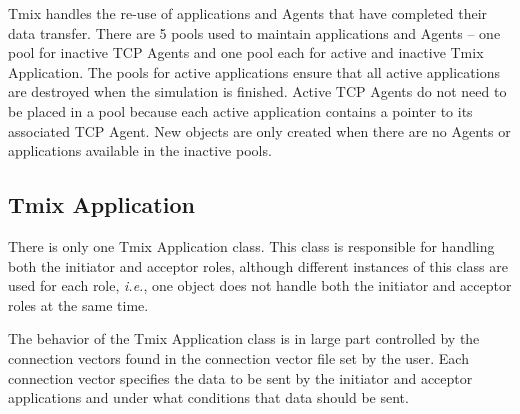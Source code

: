 Tmix handles the re-use of applications and Agents that have
completed their data transfer. There are 5 pools used to maintain
applications and Agents -- one pool for inactive TCP Agents and one
pool each for active and inactive Tmix Application. The
pools for active applications ensure that all active applications are
destroyed when the simulation is finished. Active TCP Agents do not
need to be placed in a pool because each active application contains a
pointer to its associated TCP Agent. New objects are only created when
there are no Agents or applications available in the inactive pools. 

\subsection{Tmix Application}

There is only one Tmix Application class.  This class is responsible for
handling both the initiator and acceptor roles, although different instances
of this class are used for each role, \emph{i.e.}, one object does
not handle both the initiator and acceptor roles at the same time.

The behavior of the Tmix Application class is in large part controlled by
the connection vectors found in the connection vector file set by
the user.  Each connection vector specifies the data to be sent by the initiator
and acceptor applications and under what conditions that data should be sent.




